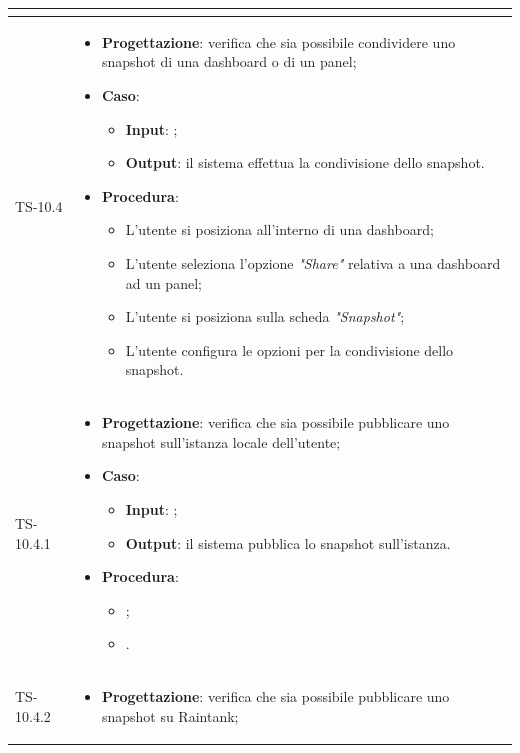 \begin{longtable}{|C{2.5cm}|C{13cm}|}
\begin{itemize}
\end{itemize}
	  \\
	\hline
	{TS-10.4} & 
\begin{itemize}
	\item \textbf{Progettazione}: verifica che sia possibile condividere uno
	snapshot di una dashboard o di un panel;
	\item \textbf{Caso}: 
	\begin{itemize}
		\item \textbf{Input}: ;
		\item \textbf{Output}: il sistema effettua la condivisione dello snapshot.
	\end{itemize}
	\item \textbf{Procedura}:
	\begin{itemize}
		\item L'utente si posiziona all'interno di una dashboard;
		\item L'utente seleziona l'opzione \emph{"Share"} relativa a una dashboard ad un panel;
		\item L'utente si posiziona sulla scheda \emph{"Snapshot"};
		\item L'utente configura le opzioni per la condivisione dello snapshot.
	\end{itemize} 
\end{itemize}
	 \\
	\hline
	{TS-10.4.1} &
\begin{itemize}
	\item \textbf{Progettazione}: verifica che sia possibile pubblicare uno
	snapshot sull'istanza locale dell'utente;
	\item \textbf{Caso}: 
	\begin{itemize}
		\item \textbf{Input}: ;
		\item \textbf{Output}: il sistema pubblica lo snapshot sull'istanza.
	\end{itemize}
	\item \textbf{Procedura}:
	\begin{itemize}
		\item ;
		\item .
	\end{itemize} 
\end{itemize}
	  \\
	\hline
	{TS-10.4.2} & 
\begin{itemize}
	\item \textbf{Progettazione}: verifica che sia possibile pubblicare uno
	snapshot su Raintank;

\end{itemize}
\end{longtable}
